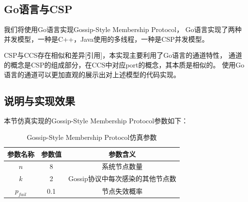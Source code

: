 \subsection{Go语言与CSP}
我们将使用Go语言实现Gossip-Style Membership Protocol，
Go语言实现了两种并发模型，一种是C++，Java使用的多线程，一种是CSP并发模型。

CSP与CCS存在相似和差异[引用]，本实现主要利用了Go语言的通道特性，
通道的概念是CSP的组成部分，在CCS中对应port的概念，其本质是相似的。
使用Go语言的通道可以更加直观的展示出对上述模型的代码实现。

\subsection{说明与实现效果}
本节仿真实现的Gossip-Style Membership Protocol参数如下：
\begin{table}[!hpt]
   \caption[Gossip-Style Membership Protocol仿真参数]{Gossip-Style Membership Protocol仿真参数\footnotemark}
   \label{tab:thirdone}
   \centering
   \begin{tabular}{@{}ccc@{}} \toprule
     参数名称 & 参数值 & 参数含义 \\ \midrule
     $n$ & 8 & 系统节点数量\\
     $k$ & 2 & Gossip协议中每次感染的其他节点数\\
     $p_{fail}$ & 0.1 & 节点失效概率\\ \bottomrule
   \end{tabular}
 \end{table}